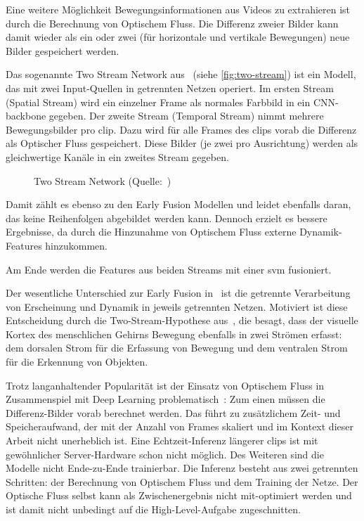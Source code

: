 Eine weitere Möglichkeit Bewegungsinformationen aus Videos zu extrahieren ist durch die Berechnung von Optischem Fluss.
Die Differenz zweier Bilder kann damit wieder als ein oder zwei (für horizontale und vertikale Bewegungen) neue Bilder gespeichert werden.

Das sogenannte Two Stream Network aus~\cite{Simonyan14} (siehe \autoref{fig:two-stream}) ist ein Modell, das mit zwei Input-Quellen in getrennten Netzen operiert.
Im ersten Stream (Spatial Stream) wird ein einzelner Frame als normales Farbbild in ein CNN-backbone gegeben.
Der zweite Stream (Temporal Stream) nimmt mehrere Bewegungsbilder pro \gls{clip}.
Dazu wird für alle Frames des \glspl{clip} vorab die Differenz als Optischer Fluss gespeichert.
Diese Bilder (je zwei pro Ausrichtung) werden als gleichwertige Kanäle in ein zweites Stream gegeben.

\begin{figure}[h!]
    \centering
    \caption{Two Stream Network (Quelle:~\cite{Simonyan14})}
    \label{fig:two-stream}
\end{figure}

Damit zählt es ebenso zu den Early Fusion Modellen und leidet ebenfalls daran, das keine Reihenfolgen abgebildet werden kann.
Dennoch erzielt es bessere Ergebnisse, da durch die Hinzunahme von Optischem Fluss externe Dynamik-Features hinzukommen.

Am Ende werden die Features aus beiden Streams mit einer \gls{svm} fusioniert.

Der wesentliche Unterschied zur Early Fusion in~\cite{Karpathy14} ist die getrennte Verarbeitung von Erscheinung und Dynamik in jeweils getrennten Netzen.
Motiviert ist diese Entscheidung durch die Two-Stream-Hypothese aus~\cite{Goodale92}, die besagt, dass der visuelle Kortex des menschlichen Gehirns Bewegung ebenfalls in zwei Strömen erfasst:
dem dorsalen Strom für die Erfassung von Bewegung und dem ventralen Strom für die Erkennung von Objekten.

Trotz langanhaltender Popularität ist der Einsatz von Optischem Fluss in Zusammenspiel mit Deep Learning problematisch~\cite{Zhu17}:
Zum einen müssen die Differenz-Bilder vorab berechnet werden.
Das führt zu zusätzlichem Zeit- und Speicheraufwand, der mit der Anzahl von Frames skaliert und im Kontext dieser Arbeit nicht unerheblich ist.
Eine Echtzeit-Inferenz längerer \glspl{clip} ist mit gewöhnlicher Server-Hardware schon nicht möglich.
Des Weiteren sind die Modelle nicht Ende-zu-Ende trainierbar.
Die Inferenz besteht aus zwei getrennten Schritten: der Berechnung von Optischem Fluss und dem Training der Netze.
Der Optische Fluss selbst kann als Zwischenergebnis nicht mit-optimiert werden und ist damit nicht unbedingt auf die High-Level-Aufgabe zugeschnitten.

